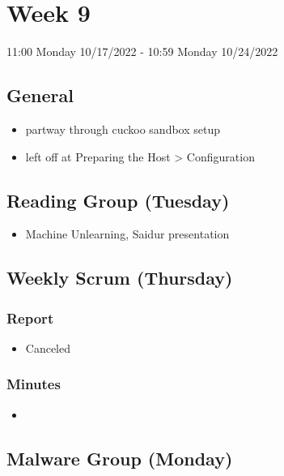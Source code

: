 \documentclass{article}
\begin{document}

\section*{Week 9}
11:00 Monday 10/17/2022 - 10:59 Monday 10/24/2022

\subsection*{General}
\begin{itemize}
	\item partway through cuckoo sandbox setup
	\item left off at Preparing the Host > Configuration
\end{itemize}

\subsection*{Reading Group (Tuesday)}
\begin{itemize}
	\item Machine Unlearning, Saidur presentation
\end{itemize}

\subsection*{Weekly Scrum (Thursday)}
\subsubsection*{Report}
\begin{itemize}
	\item Canceled
\end{itemize}
\subsubsection*{Minutes}
\begin{itemize}
	\item 
\end{itemize}

\subsection*{Malware Group (Monday)}
\end{document}

